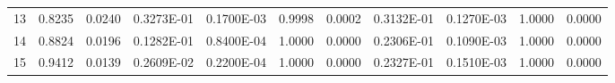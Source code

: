 \documentclass[
twocolumn,
aps,prd,
nofootinbib,
superscriptaddress,
showpacs,ligh
tightenlines, 
]{revtex4}
\begin{document}
\begin{widetext}
\begin{table}[h]
\begin{center}
\begin{tabular}{|c|c|c|c|c|c|c|c|c|c|c|}
      13               &        0.8235             &        0.0240             &     0.3273E-01             &     0.1700E-03             &        0.9998             &        0.0002             & 0.3132E-01 & 0.1270E-03 & 1.0000 & 0.0000 \\
      14                 &        0.8824             &        0.0196             &     0.1282E-01             &     0.8400E-04             &        1.0000             &        0.0000             & 0.2306E-01 & 0.1090E-03 & 1.0000 & 0.0000 \\
      15                &        0.9412             &        0.0139             &     0.2609E-02             &     0.2200E-04             &        1.0000             &        0.0000             & 0.2327E-01 & 0.1510E-03 & 1.0000 & 0.0000 \\



 \hline
\hline


\end{tabular}

\label{table:18P} 
\end{center}
 \end{table}





\end{widetext}
\end{document}

